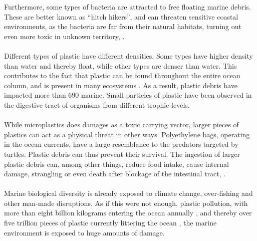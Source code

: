 Furthermore, some types of bacteria are attracted to free floating marine debris. These are better known as “hitch hikers”, and can threaten sensitive coastal environments, as the bacteria are far from their natural habitats, turning out even more toxic in unknown territory, \cite{gregory_2009}. 
\\\\
Different types of plastic have different densities. Some types have higher density than water and thereby float, while other types are denser than water. This contributes to the fact that plastic can be found throughout the entire ocean column, and is present in many ecosystems \cite{derraik_2002}. As a result, plastic debris have impacted more than 690 marine. Small particles of plastic have been observed in the digestive tract of organisms from different trophic levels. 
\\\\
While microplastics does damages as a toxic carrying vector, larger pieces of plastics can act as a physical threat in other ways. Polyethylene bags, operating in the ocean currents, have a large resemblance to the predators targeted by turtles. Plastic debris can thus prevent their survival.
The ingestion of larger plastic debris can, among other things, reduce food intake, cause internal damage, strangling or even death after blockage of the intestinal tract, \cite{derraik_2002}.
\\\\
Marine biological diversity is already exposed to climate change, over-fishing and other man-made disruptions. As if this were not enough, plastic pollution, with more than eight billion kilograms entering the ocean annually \cite{yurtoglu_lykketoft_2016}, and thereby over five trillion pieces of plastic currently littering the ocean \cite{the_ocean_cleanup}, the marine environment is exposed to huge amounts of damage. \cite{derraik_2002}

